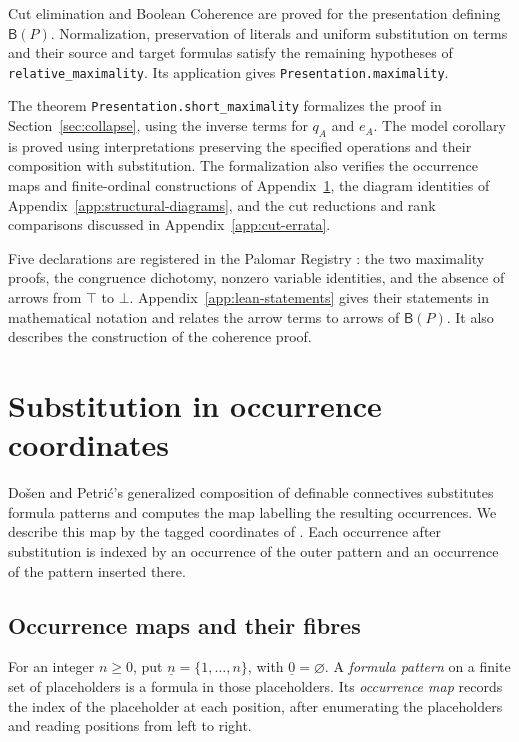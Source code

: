\documentclass[11pt]{article}
\newcommand{\B}{\mathsf B}
\begin{document}
Cut elimination and Boolean Coherence are proved for the presentation
defining $\B(P)$. Normalization, preservation of literals and
uniform substitution on terms and their source and target formulas
satisfy the remaining hypotheses of \texttt{relative\_maximality}.
Its application gives \texttt{Presentation.maximality}.

The theorem \texttt{Presentation.short\_maximality} formalizes the proof
in Section~\ref{sec:collapse}, using the inverse terms for $q_A$ and $e_A$.
The model corollary is proved using interpretations preserving the
specified operations and their composition with substitution. The formalization
also verifies the occurrence maps and finite-ordinal constructions of
Appendix~\ref{app:substitution}, the diagram identities of
Appendix~\ref{app:structural-diagrams}, and the cut reductions and rank
comparisons discussed in Appendix~\ref{app:cut-errata}.

Five declarations are registered in the Palomar Registry
\cite{palomar-2026-10-30-000014-v2}:
the two maximality proofs, the congruence dichotomy, nonzero variable
identities, and the absence of arrows from $\top$ to $\bot$.
Appendix~\ref{app:lean-statements} gives their statements in mathematical
notation and relates the arrow terms to arrows of $\B(P)$.
It also describes the construction of the coherence proof.

\appendix
\section{Substitution in occurrence coordinates}\label{app:substitution}

Do\v{s}en and Petri\'c's generalized composition of definable
connectives \cite[\S2.5, pp.~45--46]{DP} substitutes formula
patterns and computes the map labelling the resulting occurrences.
We describe this map by the tagged coordinates of
\cite[\S\S9.2--9.3]{Notation}. Each occurrence after substitution
is indexed by an occurrence of the outer pattern and an occurrence
of the pattern inserted there.

\subsection{Occurrence maps and their fibres}\label{app:profiles}

For an integer $n\geq0$, put $\underline n=\{1,\ldots,n\}$, with
$\underline0=\varnothing$. A \emph{formula pattern} on a finite set
of placeholders is a formula in those placeholders. Its
\emph{occurrence map} records the index of the placeholder at each position,
after enumerating the placeholders and reading positions from left to right.
\end{document}
